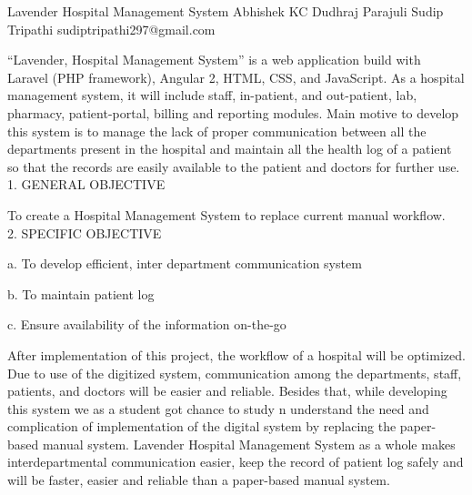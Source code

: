  \begin{conf-abstract}[]
 {Lavender Hospital Management System}
 {Abhishek KC
 	 Dudhraj Parajuli
 	 Sudip Tripathi
 }
{sudiptripathi297@gmail.com}

“Lavender, Hospital Management System” is a web application build with Laravel (PHP framework), Angular 2, HTML, CSS, and JavaScript. As a hospital management system, it will include staff, in-patient, and out-patient, lab, pharmacy, patient-portal, billing and reporting modules. Main motive to develop this system is to manage the lack of proper communication between all the departments present in the hospital and maintain all the health log of a patient so that the records are easily available to the patient and doctors for further use.
\\
1. GENERAL OBJECTIVE

To create a Hospital Management System to replace current manual workflow.
\\
2. SPECIFIC OBJECTIVE

a. To develop efficient, inter department communication system

b. To maintain patient log

c. Ensure availability of the information on-the-go

After implementation of this project, the workflow of a hospital will be optimized. Due to use of the digitized system, communication among the departments, staff, patients, and doctors will be easier and reliable. Besides that, while developing this system we as a student got chance to study n understand the need and complication of implementation of the digital system by replacing the paper-based manual system.
Lavender Hospital Management System as a whole makes interdepartmental communication easier, keep the record of patient log safely and will be faster, easier and reliable than a paper-based manual system.  
  
 \end{conf-abstract}

